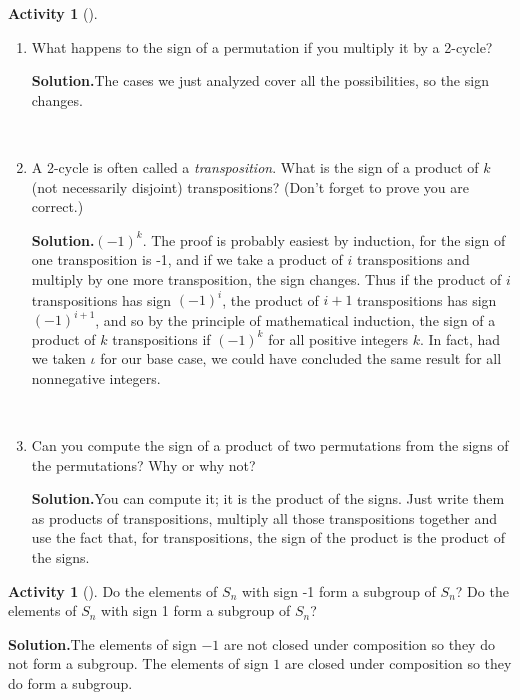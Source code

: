 \documentclass[10pt,]{book}
\theoremstyle{plain}
\theoremstyle{definition}
\newtheorem{activity}[project]{Activity}
\numberwithin{equation}{chapter}
\begin{document}
\begin{activity}[]
\begin{enumerate}[label=(\alph*)]
~\par
\item What happens to the sign of a permutation if you multiply it by a 2-cycle?%
\par\medskip\noindent%
\textbf{Solution.}\quad The cases we just analyzed cover all the possibilities, so the sign changes.%

~\par
\item A 2-cycle is often called a \emph{transposition}.  What is the sign of a product of \(k\) (not necessarily disjoint) transpositions? (Don't forget to prove you are correct.)%
\par\medskip\noindent%
\textbf{Solution.}\quad \((-1)^k\). The proof is probably easiest by induction, for the sign of one transposition is -1, and if we take a product of \(i\) transpositions and multiply by one more transposition, the sign changes. Thus if the product of \(i\) transpositions has sign \((-1)^i\), the product of \(i+1\) transpositions has sign \((-1)^{i+1}\), and so by the principle of mathematical induction, the sign of a product of \(k\) transpositions if \((-1)^k\) for all positive integers \(k\). In fact, had we taken \(\iota\) for our base case, we could have concluded the same result for all nonnegative integers.%

~\par
\item Can you compute the sign of a product of two permutations from the signs of the permutations?  Why or why not?%
\par\medskip\noindent%
\textbf{Solution.}\quad You can compute it; it is the product of the signs. Just write them as products of transpositions, multiply all those transpositions together and use the fact that, for transpositions, the sign of the product is the product of the signs.%

\end{enumerate}
\end{activity}
\begin{activity}[]\label{activity-275}
Do the elements of \(S_n\) with sign -1 form a subgroup of \(S_n\)? Do the elements of \(S_n\) with sign 1 form a subgroup of \(S_n\)?%
\par\medskip\noindent%
\textbf{Solution.}\quad The elements of sign \(-1\) are not closed under composition so they do not form a subgroup. The elements of sign \(1\) are closed under composition so they do form a subgroup.%
\end{activity}
\end{document}
